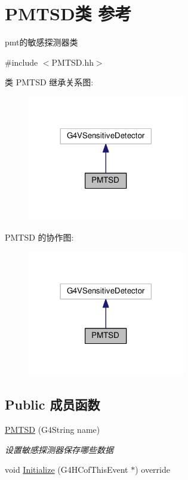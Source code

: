 \hypertarget{classPMTSD}{}\section{P\+M\+T\+S\+D类 参考}
\label{classPMTSD}


pmt的敏感探测器类  




{\ttfamily \#include $<$P\+M\+T\+S\+D.\+hh$>$}



类 P\+M\+T\+SD 继承关系图\+:\nopagebreak
\begin{figure}[H]
\begin{center}
\leavevmode
\includegraphics[width=194pt]{classPMTSD__inherit__graph}
\end{center}
\end{figure}


P\+M\+T\+SD 的协作图\+:\nopagebreak
\begin{figure}[H]
\begin{center}
\leavevmode
\includegraphics[width=194pt]{classPMTSD__coll__graph}
\end{center}
\end{figure}
\subsection*{Public 成员函数}
\begin{DoxyCompactItemize}
\item 
\hyperlink{classPMTSD_aed89d4f48ef06debf8363e4ab5540e1e}{P\+M\+T\+SD} (G4\+String name)
\begin{DoxyCompactList}\small\item\em 设置敏感探测器保存哪些数据 \end{DoxyCompactList}\item 
void \hyperlink{classPMTSD_af78a52d378f6d2832a6528e81975d385}{Initialize} (G4\+H\+Cof\+This\+Event $\ast$) override
\end{DoxyCompactItemize}

